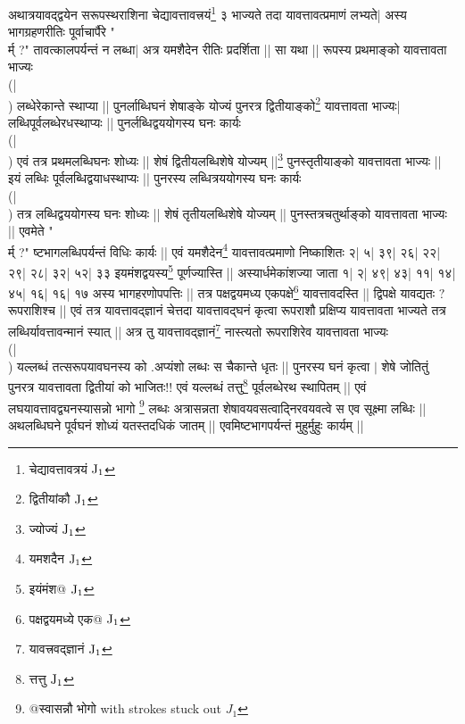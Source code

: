 \documentclass[12pt]{article}
\begin{document}
{अथात्रयावद्द्वयेन सरूपस्थराशिना
चेद्यावत्तावत्त्रयं\footnote{{\s चेद्यावत्तावत्रयं }${\rm J_1}$}
३ भाज्यते
तदा यावत्तावत्प्रमाणं लभ्यते|
अस्य भागग्रहणरीतिः पूर्वाचार्पैरे "{\\र्म् ?}" तावत्कालपर्यन्तं
न लब्धा|
अत्र यमशैदेन रीतिः प्रदर्शिता ||
सा यथा ||
रूपस्य प्रथमाङ्को यावत्तावता भाज्यः\\(|\\) लब्धेरेकान्ते
स्थाप्या ||
पुनर्लाब्धिघनं शेषाङ्के योज्यं पुनरत्र
द्वितीयाङ्को\footnote{{\s  द्वितीयांकौ }${\rm J_1}$}
यावत्तावता भाज्यः|
लब्धिपूर्वलब्धेरधस्\-थाप्यः ||
पुनर्लब्धिद्वययोगस्य घनः कार्यः\\(|\\)
एवं तत्र प्रथमलब्धिघनः शोध्यः ||
शेषं द्वितीयलब्धिशेषे योज्यम् ||\footnote{{\s ज्योज्यं }${\rm J_1}$}
पुनस्तृतीयाङ्को यावत्तावता भाज्यः ||
इयं लब्धिः पूर्वलब्धिद्वयाधस्थाप्यः ||
पुनरस्य लब्धित्रययोगस्य घनः कार्यः\\(|\\)
तत्र लब्धिद्वययोगस्य घनः शोध्यः ||
शेषं तृतीयलब्धिशेषे योज्यम् ||
पुनस्तत्रचतुर्थाङ्को यावत्तावता भाज्यः ||
एवमेते "{\\र्म् ?}" ष्टभागलब्धिपर्यन्तं विधिः कार्यः ||
एवं यमशैदेन\footnote{{\s यमशदैन }${\rm J_1}$}
यावत्तावत्प्रमाणो निष्काशितः २| ५| ३९| २६| २२| २९| २८| ३२| ५२| ३३
इयमंशद्वयस्य\footnote{{\s इयंमंश@ }${\rm J_1}$}
पूर्णज्यास्ति ||
अस्यार्धमेकांशज्या जाता १| २| ४९| ४३| ११| १४| ४५| १६| १६| १७
अस्य भागहरणोपपत्तिः ||
तत्र पक्षद्वयमध्य एकपक्षे\footnote{{\s पक्षद्वयमध्ये एक@ }${\rm J_1}$}
यावत्तावदस्ति ||
द्विपक्षे यावद्यतः $?$ रूपराशिश्च ||
एवं तत्र यावत्तावद्ज्ञानं चेत्तदा यावत्तावद्घनं कृत्वा
रूपराशौ प्रक्षिप्य यावत्तावता भाज्यते तत्र लब्धिर्यावत्तावन्मानं
स्यात् ||
अत्र तु यावत्तावद्ज्ञानं\footnote{{\s यावत्त्रवद्ज्ञानं }${\rm J_1}$}
नास्त्यतो रूपराशिरेव यावत्तावता भाज्यः\\(|\\)
यल्लब्धं तत्सरूपयावघनस्य को .अप्यंशो लब्धः
स चैकान्ते धृतः ||
पुनरस्य घनं कृत्वा $|$ 
शेषे जोतितुं पुनरत्र यावत्तावता द्वितीयां को भाजितः!!
एवं यल्लब्धं तत्तु\footnote{{\s त्तत्तु }${\rm J_1}$}
पूर्वलब्धेरथ स्थापितम् ||
एवं लघयावत्तावद्व्यनस्यासन्नो भागो
\footnote{{\s @स्वासन्नौ भोगो } with strokes stuck out $J_1$} %
लब्धः %
अत्रासन्नता शेषावयवसत्वाद्निरवयवत्वे स एव सूक्ष्मा
लब्धिः ||
अथलब्धिघने पूर्वघनं शोध्यं यतस्तदधिकं जातम् ||
एवमिष्टभागपर्यन्तं मुहुर्मुहुः कार्यम् ||

}
\end{document}
